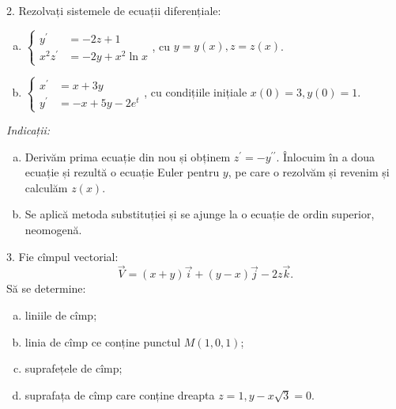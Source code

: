 \vspace{1cm}

2. Rezolvați sistemele de ecuații diferențiale:
\begin{enumerate}[(a)]
    \item $ \begin{cases}
            y^\prime &= -2z + 1 \\
            x^2 z^\prime &= -2y + x^2 \ln x
        \end{cases} $, cu $ y = y(x), z = z(x) $.
    \item $ \begin{cases}
            x^\prime &= x + 3y \\
            y^\prime &= -x + 5y - 2e^t
        \end{cases} $, cu condițiile inițiale $ x(0) = 3, y(0) = 1 $.
\end{enumerate}

\emph{Indicații:}
\begin{enumerate}[(a)]
    \item Derivăm prima ecuație din nou și obținem $ z^\prime = - y^{\prime\prime} $. Înlocuim în
        a doua ecuație și rezultă o ecuație Euler pentru $ y $, pe care o rezolvăm și revenim și calculăm
        $ z(x) $.
    \item Se aplică metoda substituției și se ajunge la o ecuație de ordin superior, neomogenă.
\end{enumerate}

\vspace{1cm}

3. Fie cîmpul vectorial:
\[
    \vec{V} = (x + y)\vec{i} + (y - x)\vec{j} - 2z\vec{k}.
\]
Să se determine:
\begin{enumerate}[(a)]
    \item liniile de cîmp;
    \item linia de cîmp ce conține punctul $ M(1, 0, 1) $;
    \item suprafețele de cîmp;
    \item suprafața de cîmp care conține dreapta $ z = 1, y - x\sqrt{3} = 0 $.
\end{enumerate}

